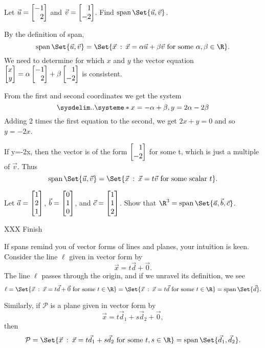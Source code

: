 \begin{example}
	Let $\vec u=\mat{-1\\2}$ and $\vec v=\mat{1\\-2}$. Find $\Span\Set{\vec u,\vec v}$.

	By the definition of span,
	\[
		\Span\Set{\vec u,\vec v}=
		\Set{\vec x\given \vec x=\alpha\vec u+\beta\vec v\text{ for some }\alpha,\beta\in\R}.
	\]
	We need to determine for which $x$ and $y$ the vector equation $\mat{x\\y} = \alpha\mat{-1\\2}+\beta\mat{1\\-2}$ is consistent.
	
	From the first and second coordinates we get the system
	\[
		\sysdelim..\systeme*{x=-\alpha+\beta, y=2\alpha-2\beta}
	\]
	Adding 2 times the first equation to the second, we get $2x+y=0$ and so $y=-2x$.
	
	If y=-2x, then the vector is of the form $\mat{1\\-2}$ for some t, which is just a multiple of $\vec v$. Thus
	\[
		\Span\Set{\vec u,\vec v}=
		\Set{\vec x\given \vec x=t\vec v\text{ for some scalar }t}.
	\]
\end{example}

\begin{example}
	Let $\vec a=\mat{1\\2\\1}$, $\vec b=\mat{0\\1\\0}$, and $\vec c=\mat{1\\1\\2}$. Show that
	$\R^3=\Span\Set{\vec a,\vec b,\vec c}$.

	XXX Finish
\end{example}


If spans remind you of vector forms of lines and planes, your intuition is keen.
Consider the line $\ell$ given in vector form by
\[
	\vec x=t\vec d+\vec 0.
\]
The line $\ell$ passes through the origin, and if we unravel its definition, we see
\[
	\ell=\Set{\vec x\given \vec x=t\vec d+\vec 0\text{ for some }t\in \R}
	=\Set{\vec x\given \vec x=t\vec d\text{ for some }t\in \R}=\Span\Set{\vec d}.
\]

Similarly, if $\mathcal P$ is a plane given in vector form by
\[
	\vec x=t\vec d_1+s\vec d_2+\vec 0,
\]
then
\[
	\mathcal P=
	\Set{\vec x\given \vec x=t\vec d_1+s\vec d_2\text{ for some }t,s\in \R}=\Span\Set{\vec d_1,\vec d_2}.
\]

